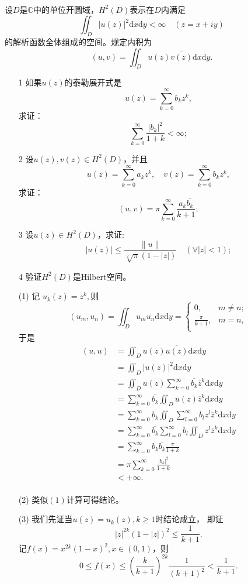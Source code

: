 \begin{exercise}
\hfill\\
设$D$是$\mathbb{C}$中的单位开圆域，$H^2(D)$表示在$D$内满足
$$\iint_D|u(z)|^2\mathrm{d}x\mathrm{d}y<\infty\quad(z=x+iy)$$
的解析函数全体组成的空间。规定内积为
$$(u,v)=\iint_Du(z)\overline{v(z)}\mathrm{d}x\mathrm{d}y.$$
\begin{enumerate}
\item[1] 如果$u(z)$的泰勒展开式是
$$u(z)=\sum_{k=0}^{\infty}b_kz^k,$$
求证：
$$\sum_{k=0}^{\infty}\frac{|b_k|^2}{1+k}<\infty;$$
\item[2] 设$u(z),v(z)\in H^2(D)$，并且
$$u(z)=\sum_{k=0}^{\infty}a_kz^k,\quad v(z)=\sum_{k=0}^{\infty}b_kz^k,$$
求证：
$$(u,v)=\pi\sum_{k=0}^{\infty}\frac{a_k\overline{b_k}}{k+1};$$
\item[3] 设$u(z)\in H^2(D)$，求证:
$$|u(z)|\leq\frac{\|u\|}{\sqrt[2]{\pi}(1-|z|)}\quad(\forall|z|<1);$$
\item[4] 验证$H^2(D)$是Hilbert空间。
\end{enumerate}

\begin{enumerate}
\item[(1)]记 $u_k(z)=z^k,$则
$$
(u_m,u_n)=\iint_Du_m\overline{u_n}\mathrm{d}x\mathrm{d}y=\begin{cases}
0,&m\neq n;\\
\frac{\pi}{k+1},&m=n,\\
\end{cases}
$$
于是
\begin{align*}
(u,u)&=\iint_Du(z)\overline{u(z)}\mathrm{d}x\mathrm{d}y\\
&=\iint_D|u(z)|^2\mathrm{d}x\mathrm{d}y\\
&=\iint_Du(z)\sum_{k=0}^{\infty}\overline{b_k}\overline{z}^k\mathrm{d}x\mathrm{d}y\\
&=\sum_{k=0}^{\infty}\overline{b_k}\iint_Du(z)\overline{z}^k\mathrm{d}x\mathrm{d}y\\
&=\sum_{k=0}^{\infty}\overline{b_k}\iint_D\sum_{l=0}^{\infty}b_lz^l\overline{z}^k\mathrm{d}x\mathrm{d}y\\
&=\sum_{k=0}^{\infty}\overline{b_k}\sum_{l=0}^{\infty}b_l\iint_Dz^l\overline{z}^k\mathrm{d}x\mathrm{d}y\\
&=\sum_{k=0}^{\infty}b_k\overline{b_k}\frac{\pi}{1+k}\\
&=\pi\sum_{k=0}^{\infty}\frac{|b_k|^2}{1+k}\\
&<+\infty.\\
\end{align*}
\item[(2)]类似$(1)$计算可得结论。
\item[(3)]我们先证当$u(z)=u_k(z),k\geq1$时结论成立，
即证$$|z|^{2k}(1-|z|)^2\leq\frac{1}{k+1}.$$
记$f(x)=x^{2k}(1-x)^2,x\in(0,1)$，则
$$0\leq f(x)\leq(\frac{k}{k+1})^{2k}\frac{1}{(k+1)^2}<\frac{1}{k+1}.$$


\end{enumerate}
\end{exercise}
